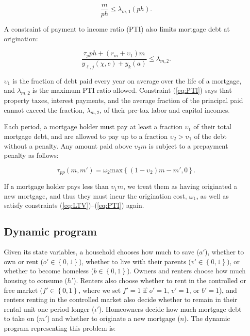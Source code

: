 \documentclass[parskip=full]{article}
\begin{document}
\begin{equation}\label{eq:LTV}
\frac{m}{p h} \leq \lambda_{m,1}(ph).
\end{equation}

\noindent A constraint of payment to income ratio (PTI) also limits mortgage debt at origination: 

\begin{equation}\label{eq:PTI}
\frac{\tau_{p}ph+(r_{m}+\upsilon_{1})m}{y_{\ell,j}(\chi,e)+y_{k}(a)} \leq \lambda_{m,2}.
\end{equation}

\noindent $\upsilon_{1}$ is the fraction of debt paid every year on average over the life of a mortgage, and $\lambda_{m,2}$ is the maximum PTI ratio allowed. Constraint (\ref{eq:PTI}) says that property taxes, interest payments, and the average fraction of the principal paid cannot exceed the fraction, $\lambda_{m,2}$, of their pre-tax labor and capital incomes. 

Each period, a mortgage holder must pay at least a fraction $\upsilon_{1}$ of their total mortgage debt, and are allowed to pay up to a fraction $\upsilon_{2}>\upsilon_{1}$ of the debt without a penalty. Any amount paid above $\upsilon_{2}m$ is subject to a prepayment penalty as follows: 

\begin{equation}\label{eq:prepayment_penalty}
\tau_{pp}(m,m')=\omega_{2}\mbox{max}\left\{(1-\upsilon_{2})m-m',0\right\}.
\end{equation}

\noindent If a mortgage holder pays less than $\upsilon_{1}m$, we treat them as having originated a new mortgage, and thus they must incur the origination cost, $\omega_{1}$, as well as satisfy constraints (\ref{eq:LTV})--(\ref{eq:PTI}) again.

\subsection{Dynamic program}\label{subsection:household_optimization}
Given its state variables, a household chooses how much to save ($a'$), whether to own or rent ($o' \in \left\{0,1\right\}$), whether to live with their parents ($v' \in \left\{0,1\right\}$), or whether to become homeless ($b \in \left\{0,1\right\}$). Owners and renters choose how much housing to consume ($h'$). Renters also choose whether to rent in the controlled or free market ($f' \in \left\{0,1\right\}$, where we set $f'=1$ if $o'=1$, $v'=1$, or $b'=1$), and renters renting in the controlled market also decide whether to remain in their rental unit one period longer ($\iota'$). Homeowners decide how much mortgage debt to take on ($m'$) and whether to originate a new mortgage ($n$). The dynamic program representing this problem is:
\end{document}
